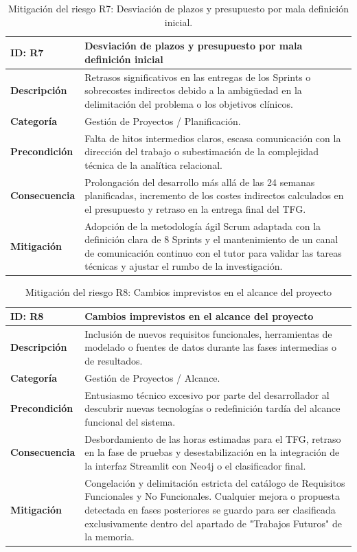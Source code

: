 \documentclass[12pt,a4paper,onecolumn,oneside]{report}
\begin{document}
\begin{table}[htbp]
\centering
\small
\begin{tabular}{|p{2.5cm}|p{10.5cm}|}
\hline
\rowcolor[RGB]{230,230,230} \textbf{ID: R7} & \textbf{Desviación de plazos y presupuesto por mala definición inicial} \\ \hline
\textbf{Descripción} & Retrasos significativos en las entregas de los Sprints o sobrecostes indirectos debido a la ambigüedad en la delimitación del problema o los objetivos clínicos. \\ \hline
\textbf{Categoría} & Gestión de Proyectos / Planificación. \\ \hline
\textbf{Precondición} & Falta de hitos intermedios claros, escasa comunicación con la dirección del trabajo o subestimación de la complejidad técnica de la analítica relacional. \\ \hline
\textbf{Consecuencia} & Prolongación del desarrollo más allá de las 24 semanas planificadas, incremento de los costes indirectos calculados en el presupuesto y retraso en la entrega final del TFG. \\ \hline
\textbf{Mitigación} & Adopción de la metodología ágil Scrum adaptada con la definición clara de 8 Sprints y el mantenimiento de un canal de comunicación continuo con el tutor para validar las tareas técnicas y ajustar el rumbo de la investigación. \\ \hline
\end{tabular}
\label{tab:R7}
\caption{Mitigación del riesgo R7: Desviación de plazos y presupuesto por mala definición inicial.}
\end{table}

\begin{table}[htbp]
\centering
\small
\begin{tabular}{|p{2.5cm}|p{10.5cm}|}
\hline
\rowcolor[RGB]{230,230,230} \textbf{ID: R8} & \textbf{Cambios imprevistos en el alcance del proyecto} \\ \hline
\textbf{Descripción} & Inclusión de nuevos requisitos funcionales, herramientas de modelado o fuentes de datos durante las fases intermedias o de resultados. \\ \hline
\textbf{Categoría} & Gestión de Proyectos / Alcance. \\ \hline
\textbf{Precondición} & Entusiasmo técnico excesivo por parte del desarrollador al descubrir nuevas tecnologías o redefinición tardía del alcance funcional del sistema. \\ \hline
\textbf{Consecuencia} & Desbordamiento de las horas estimadas para el TFG, retraso en la fase de pruebas y desestabilización en la integración de la interfaz Streamlit con Neo4j o el clasificador final. \\ \hline
\textbf{Mitigación} & Congelación y delimitación estricta del catálogo de Requisitos Funcionales y No Funcionales. Cualquier mejora o propuesta detectada en fases posteriores se guardo para ser clasificada exclusivamente dentro del apartado de "Trabajos Futuros" de la memoria. \\ \hline
\end{tabular}
\label{tab:R8}
\caption{Mitigación del riesgo R8: Cambios imprevistos en el alcance del proyecto}
\end{table}
\end{document}
